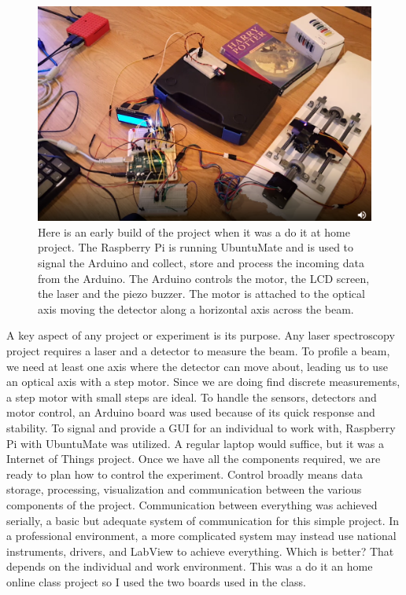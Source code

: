 \documentclass[11pt,a4paper]{book}
\begin{document}
		\begin{figure} [!ht]
			\centering
			\def\svgwidth{\columnwidth}
			\Huge
			\includegraphics[scale=0.35]{images/chapter-1/internet_of_things_for_project}
			\caption{Here is an early build of the project when it was a do it at home project. The Raspberry Pi is running UbuntuMate and is used to signal the Arduino and collect, store and process the incoming data from the Arduino. The Arduino controls the motor, the LCD screen, the laser and the piezo buzzer. The motor is attached to the optical axis moving the detector along a horizontal axis across the beam. }
			\label{fig:internet_of_things_for_project}
		\end{figure}
	
		A key aspect of any project or experiment is its purpose. Any laser spectroscopy project requires a laser and a detector to measure the beam. To profile a beam, we need at least one axis where the detector can move about, leading us to use an optical axis with a step motor. Since we are doing find discrete measurements, a step motor with small steps are ideal. To handle the sensors, detectors and motor control, an Arduino board was used because of its quick response and stability. To signal and provide a GUI for an individual to work with, Raspberry Pi with UbuntuMate was utilized. A regular laptop would suffice, but it was a Internet of Things project. Once we have all the components required, we are ready to plan how to control the experiment. Control broadly means data storage, processing, visualization and communication between the various components of the project. Communication between everything was achieved serially, a basic but adequate system of communication for this simple project. In a professional environment, a more complicated system may instead use national instruments, drivers, and LabView to achieve everything. Which is better? That depends on the individual and work environment. This was a do it an home online class project so I used the two boards used in the class.
			
\end{document}
